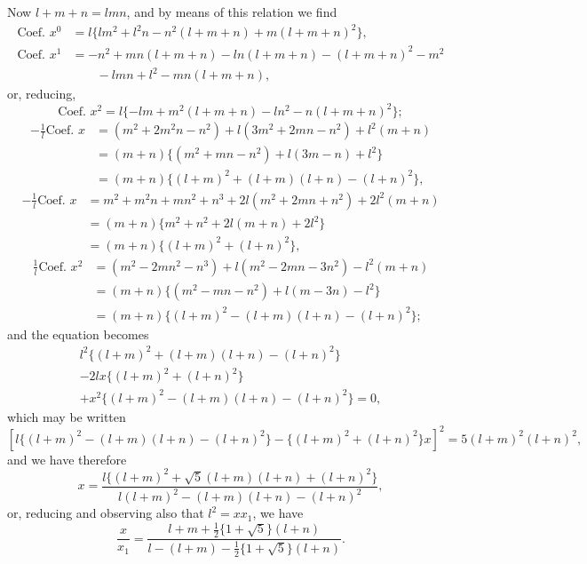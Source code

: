 \documentclass[11pt,a4paper]{book}
\begin{document}
Now $l + m + n = lmn$, and by means of this relation we find
\begin{align*}
\text{Coef. }x^0 &= l\{lm^2 + l^2n - n^2(l + m + n) + m(l + m + n)^2\},\\
\text{Coef. }x^1 &= -n^2 + mn(l + m + n) - ln(l + m + n) - (l + m + n)^2 - m^2\\
&\qquad - lmn + l^2 - mn(l + m + n),
\end{align*}
or, reducing,
\[
\text{Coef. }x^2 = l\{-lm + m^2(l + m + n) - ln^2 - n(l + m + n)^2\};
\]
\begin{align*}
-\tfrac{1}{l}\text{Coef. }x &= (m^2 + 2m^2n - n^2) + l(3m^2 + 2mn - n^2) + l^2(m + n)\\
&= (m + n)\{(m^2 + mn - n^2) + l(3m - n) + l^2\}\\
&= (m + n)\{(l + m)^2 + (l + m)(l + n) - (l + n)^2\},
\end{align*}
\begin{align*}
-\tfrac{1}{l}\text{Coef. }x &= m^2 + m^2n + mn^2 + n^3 + 2l(m^2 + 2mn + n^2) + 2l^2(m + n)\\
&= (m + n)\{m^2 + n^2 + 2l(m + n) + 2l^2\}\\
&= (m + n)\{(l + m)^2 + (l + n)^2\},
\end{align*}
\begin{align*}
\tfrac{1}{l}\text{Coef. }x^2 &= (m^2 - 2mn^2 - n^3) + l(m^2 - 2mn - 3n^2) - l^2(m + n)\\
&= (m + n)\{(m^2 - mn - n^2) + l(m - 3n) - l^2\}\\
&= (m + n)\{(l + m)^2 - (l + m)(l + n) - (l + n)^2\};
\end{align*}
and the equation becomes
\begin{multline*}
l^2\{(l + m)^2 + (l + m)(l + n) - (l + n)^2\}\\
- 2lx\{(l + m)^2 + (l + n)^2\}\\
+ x^2\{(l + m)^2 - (l + m)(l + n) - (l + n)^2\} = 0,
\end{multline*}
which may be written
\[
[l\{(l + m)^2 - (l + m)(l + n) - (l + n)^2\} - \{(l + m)^2 + (l + n)^2\}x]^2 = 5(l + m)^2(l + n)^2,
\]
and we have therefore
\[
x = \frac{l\{(l + m)^2 + \sqrt{5}(l + m)(l + n) + (l + n)^2\}}{l(l + m)^2 - (l + m)(l + n) - (l + n)^2},
\]
or, reducing and observing also that $l^2 = xx_1$, we have
\[
\frac{x}{x_1} = \frac{l + m + \tfrac{1}{2}\{1 + \sqrt{5}\}(l + n)}{l - (l + m) - \tfrac{1}{2}\{1 + \sqrt{5}\}(l + n)}.
\]
\end{document}
